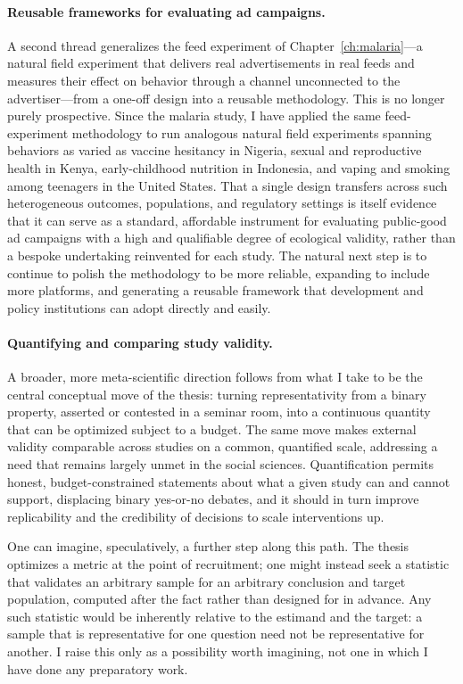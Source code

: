 \paragraph{Reusable frameworks for evaluating ad campaigns.} A second thread generalizes the feed experiment of Chapter~\ref{ch:malaria}---a natural field experiment that delivers real advertisements in real feeds and measures their effect on behavior through a channel unconnected to the advertiser---from a one-off design into a reusable methodology. This is no longer purely prospective. Since the malaria study, I have applied the same feed-experiment methodology to run analogous natural field experiments spanning behaviors as varied as vaccine hesitancy in Nigeria, sexual and reproductive health in Kenya, early-childhood nutrition in Indonesia, and vaping and smoking among teenagers in the United States. That a single design transfers across such heterogeneous outcomes, populations, and regulatory settings is itself evidence that it can serve as a standard, affordable instrument for evaluating public-good ad campaigns with a high and qualifiable degree of ecological validity, rather than a bespoke undertaking reinvented for each study. The natural next step is to continue to polish the methodology to be more reliable, expanding to include more platforms, and generating a reusable framework that development and policy institutions can adopt directly and easily. 

\paragraph{Quantifying and comparing study validity.} A broader, more meta-scientific direction follows from what I take to be the central conceptual move of the thesis: turning representativity from a binary property, asserted or contested in a seminar room, into a continuous quantity that can be optimized subject to a budget. The same move makes external validity comparable across studies on a common, quantified scale, addressing a need that remains largely unmet in the social sciences. Quantification permits honest, budget-constrained statements about what a given study can and cannot support, displacing binary yes-or-no debates, and it should in turn improve replicability and the credibility of decisions to scale interventions up.

One can imagine, speculatively, a further step along this path. The thesis optimizes a metric at the point of recruitment; one might instead seek a statistic that validates an arbitrary sample for an arbitrary conclusion and target population, computed after the fact rather than designed for in advance. Any such statistic would be inherently relative to the estimand and the target: a sample that is representative for one question need not be representative for another. I raise this only as a possibility worth imagining, not one in which I have done any preparatory work.  


